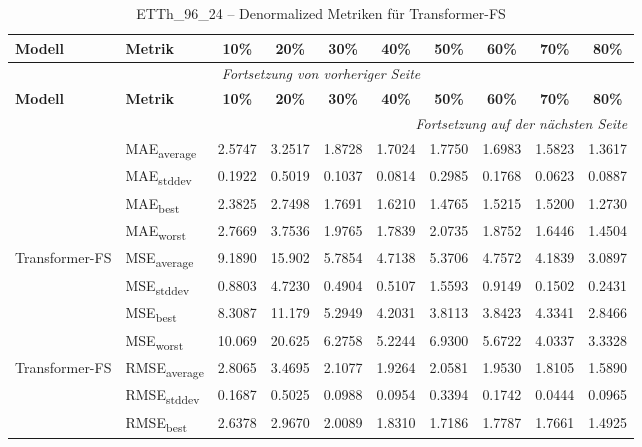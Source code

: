 {\small
\begin{longtable}{l l c c c c c c c c}
    \toprule
    \textbf{Modell} & \textbf{Metrik} & \textbf{10\%} & \textbf{20\%} & \textbf{30\%} & \textbf{40\%} & \textbf{50\%} & \textbf{60\%} & \textbf{70\%} & \textbf{80\%} \\
    \midrule
    \endfirsthead
    \multicolumn{10}{c}{\textit{Fortsetzung von vorheriger Seite}} \\
    \toprule
    \textbf{Modell} & \textbf{Metrik} & \textbf{10\%} & \textbf{20\%} & \textbf{30\%} & \textbf{40\%} & \textbf{50\%} & \textbf{60\%} & \textbf{70\%} & \textbf{80\%} \\
    \midrule
    \endhead
    \midrule
    \multicolumn{10}{r}{\textit{Fortsetzung auf der nächsten Seite}} \\
    \midrule
    \endfoot
    \bottomrule
    \caption{ETTh_96_24 -- Denormalized Metriken für Transformer-FS}
    \label{tab:etth_96_24_denormalized_transformer-fs}
    \endlastfoot
\multirow{4}{*}{Transformer-FS} & MAE\textsubscript{average} & 2.5747 & 3.2517 & 1.8728 & 1.7024 & 1.7750 & 1.6983 & 1.5823 & 1.3617 \\
 & MAE\textsubscript{stddev} & 0.1922 & 0.5019 & 0.1037 & 0.0814 & 0.2985 & 0.1768 & 0.0623 & 0.0887 \\
 & MAE\textsubscript{best} & 2.3825 & 2.7498 & 1.7691 & 1.6210 & 1.4765 & 1.5215 & 1.5200 & 1.2730 \\
 & MAE\textsubscript{worst} & 2.7669 & 3.7536 & 1.9765 & 1.7839 & 2.0735 & 1.8752 & 1.6446 & 1.4504 \\
\cmidrule(lr){2-10}
\multirow{4}{*}{Transformer-FS} & MSE\textsubscript{average} & 9.1890 & 15.902 & 5.7854 & 4.7138 & 5.3706 & 4.7572 & 4.1839 & 3.0897 \\
 & MSE\textsubscript{stddev} & 0.8803 & 4.7230 & 0.4904 & 0.5107 & 1.5593 & 0.9149 & 0.1502 & 0.2431 \\
 & MSE\textsubscript{best} & 8.3087 & 11.179 & 5.2949 & 4.2031 & 3.8113 & 3.8423 & 4.3341 & 2.8466 \\
 & MSE\textsubscript{worst} & 10.069 & 20.625 & 6.2758 & 5.2244 & 6.9300 & 5.6722 & 4.0337 & 3.3328 \\
\cmidrule(lr){2-10}
\multirow{4}{*}{Transformer-FS} & RMSE\textsubscript{average} & 2.8065 & 3.4695 & 2.1077 & 1.9264 & 2.0581 & 1.9530 & 1.8105 & 1.5890 \\
 & RMSE\textsubscript{stddev} & 0.1687 & 0.5025 & 0.0988 & 0.0954 & 0.3394 & 0.1742 & 0.0444 & 0.0965 \\
 & RMSE\textsubscript{best} & 2.6378 & 2.9670 & 2.0089 & 1.8310 & 1.7186 & 1.7787 & 1.7661 & 1.4925 \\

\end{longtable}}
